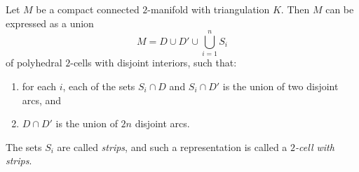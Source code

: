 Let $M$ be a compact connected $2$-manifold with triangulation $K$. Then $M$ can be expressed as a union
$$M = D \cup D' \cup \bigcup_{i=1}^{n} S_i$$
of polyhedral $2$-cells with disjoint interiors, such that:
\begin{enumerate}
\item for each $i$, each of the sets $S_i \cap D$ and $S_i \cap D'$ is the union of two disjoint arcs, and
\item $D \cap D'$ is the union of $2n$ disjoint arcs.
\end{enumerate}
The sets $S_i$ are called \emph{strips}, and such a representation is called a \emph{$2$-cell with strips}.
